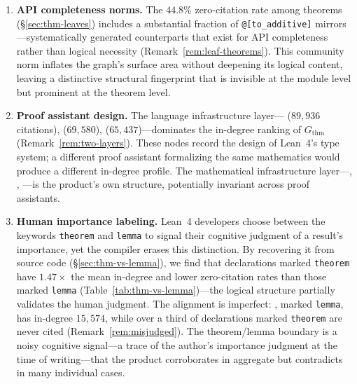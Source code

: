 \begin{enumerate}
\item \textbf{API completeness norms.} The $44.8\%$ zero-citation rate among theorems (\S\ref{sec:thm-leaves}) includes a substantial fraction of \texttt{@[to\_additive]} mirrors---systematically generated counterparts that exist for API completeness rather than logical necessity (Remark~\ref{rem:leaf-theorems}). This community norm inflates the graph's surface area without deepening its logical content, leaving a distinctive structural fingerprint that is invisible at the module level but prominent at the theorem level.

\item \textbf{Proof assistant design.} The language infrastructure layer--- ($89{,}936$ citations),  ($69{,}580$),  ($65{,}437$)---dominates the in-degree ranking of $G_{\mathrm{thm}}$ (Remark~\ref{rem:two-layers}). These nodes record the design of Lean~4's type system; a different proof assistant formalizing the same mathematics would produce a different in-degree profile. The mathematical infrastructure layer---, , ---is the product's own structure, potentially invariant across proof assistants.

\item \textbf{Human importance labeling.} Lean~4 developers choose between the keywords \texttt{theorem} and \texttt{lemma} to signal their cognitive judgment of a result's importance, yet the compiler erases this distinction. By recovering it from source code (\S\ref{sec:thm-vs-lemma}), we find that declarations marked \texttt{theorem} have $1.47\times$ the mean in-degree and lower zero-citation rates than those marked \texttt{lemma} (Table~\ref{tab:thm-vs-lemma})---the logical structure partially validates the human judgment. The alignment is imperfect: , marked \texttt{lemma}, has in-degree $15{,}574$, while over a third of declarations marked \texttt{theorem} are never cited (Remark~\ref{rem:misjudged}). The theorem/lemma boundary is a noisy cognitive signal---a trace of the author's importance judgment at the time of writing---that the product corroborates in aggregate but contradicts in many individual cases.


\end{enumerate}
